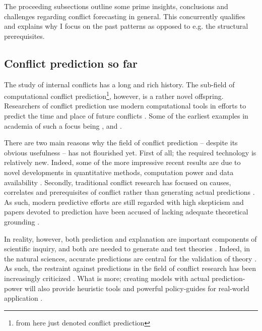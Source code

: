 \documentclass[a4paper]{article}
\begin{document}
The proceeding subsections outline some prime insights, conclusions and challenges regarding conflict forecasting in general. This concurrently qualifies and explains why I focus on the past patterns as opposed to e.g. the structural prerequisites.\par

\subsection{Conflict prediction so far}

The study of internal conflicts has a long and rich history. The sub-field of computational conflict prediction\footnote{from here just denoted conflict prediction}, however, is a rather novel offspring. Researchers of conflict prediction use modern computational tools in efforts to predict the time and place of future conflicts \citep{cederman2017predicting, chadefaux2017conflict}. Some of the earliest examples in academia of such a focus being \cite{Goldstone_2010}, \cite{Hegre2013} and \cite{perry_2013}.\par

There are two main reasons why the field of conflict prediction -- despite its obvious usefulness -- has not flourished yet. First of all; the required technology is relatively new. Indeed, some of the more impressive recent results are due to novel developments in quantitative methods, computation power and data availability \citep{ol2010afghanistan, perry_2013}. Secondly, traditional conflict research has focused on causes, correlates and prerequisites of conflict rather than generating actual predictions \citep[8]{chadefaux2017conflict}. As such, modern predictive efforts are still regarded with high skepticism and papers devoted to prediction have been accused of lacking adequate theoretical grounding \citep[8-9]{chadefaux2017conflict}. 

In reality, however, both prediction and explanation are important components of scientific inquiry, and both are needed to generate and test theories \citep{Schrodt_2014, chadefaux2017conflict}. Indeed, in the natural sciences, accurate predictions are central for the validation of theory \citep[289]{Schrodt_2014}. As such, the restraint against predictions in the field of conflict research has been increasingly criticized \citep{King_Zeng_2001, Ward_Greenhill_Bakke_2010, Goldstone_2010, Schrodt_2014, chadefaux2017conflict}. What is more; creating models with actual prediction-power will also provide heuristic tools and powerful policy-guides for real-world application \citep[372]{Ward_Greenhill_Bakke_2010}.\par
\end{document}
